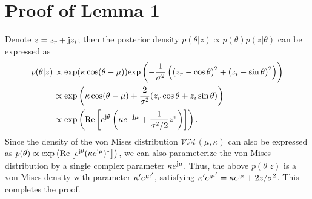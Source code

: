 \documentclass[journal,twocolumn]{IEEEtran}
\theoremstyle{nonumberplain}
\def \exp {\text{exp}}
\def \VM {\mathcal{VM}}
\def \re {\text{Re}}
\begin{document}
\section{Proof of \textbf{Lemma 1}}
\label{Proof of Lemma 1}
        Denote $z=z_r + {\rm j} z_i$; then the posterior density $p(\theta | z) \propto p(\theta)p(z|\theta)$ can be expressed as
        \begin{equation}
            \begin{aligned}
                p(\theta|z) & \propto \exp(\kappa \cos(\theta - \mu))\exp\left(-\frac{1}{\sigma^2}\left(\left(z_r - \cos\theta\right)^2 + \left(z_i - \sin\theta\right)^2\right)\right) \\
                & \propto \exp\left( \kappa \cos(\theta - \mu) + \frac{2}{\sigma^2}(z_r \cos\theta + z_i\sin\theta) \right) \\
                & \propto \exp\left( \re\left[ e^{{\rm j} \theta}\left(\kappa e^{-{\rm j}\mu} + \frac{1}{\sigma^2/2} z^*\right)\right] \right).
            \end{aligned}
        \end{equation}
        Since the density of the von Mises distribution $\VM(\mu, \kappa)$ can also be expressed as $p(\theta) \propto \exp\left( \re\left[ e^{{\rm j} \theta}(\kappa e^{{\rm j} \mu})^* \right] \right)$, we can also parameterize the von Mises distribution by a single complex parameter $\kappa e^{{\rm j}\mu}$. Thus, the above $p(\theta|z)$ is a von Mises density with parameter $\kappa'e^{{\rm j}\mu'}$, satisfying $\kappa' e^{{\rm j}\mu'} = \kappa e^{{\rm j}\mu} +2z/\sigma^2$. This completes the proof.
\end{document}
